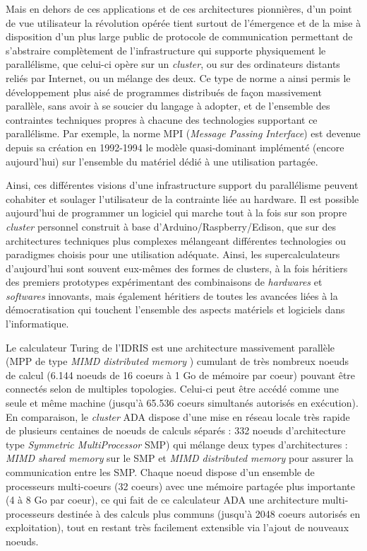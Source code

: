 Mais en dehors de ces applications et de ces architectures pionnières, d’un point de vue utilisateur la révolution opérée tient surtout de l’émergence et de la mise à disposition d’un plus large public de protocole de communication permettant de s’abstraire complètement de l’infrastructure qui supporte physiquement le parallélisme, que celui-ci opère sur un \textit{cluster}, ou sur des ordinateurs distants reliés par Internet, ou un mélange des deux. Ce type de norme a ainsi permis le développement plus aisé de programmes distribués de façon massivement parallèle, sans avoir à se soucier du langage à adopter, et de l’ensemble des contraintes techniques propres à chacune des technologies supportant ce parallélisme. Par exemple, la norme MPI (\textit{Message Passing Interface}) est devenue depuis sa création en 1992-1994 le modèle quasi-dominant implémenté (encore aujourd’hui) sur l’ensemble du matériel dédié à une utilisation partagée.

Ainsi, ces différentes visions d'une infrastructure support du parallélisme peuvent cohabiter et soulager l'utilisateur de la contrainte liée au hardware. Il est possible aujourd'hui de programmer un logiciel qui marche tout à la fois sur son propre \textit{cluster} personnel construit à base d'Arduino/Raspberry/Edison, que sur des architectures techniques plus complexes mélangeant différentes technologies ou paradigmes choisis pour une utilisation adéquate. Ainsi, les supercalculateurs d'aujourd'hui sont souvent eux-mêmes des formes de clusters, à la fois héritiers des premiers prototypes expérimentant des combinaisons de \textit{hardwares} et \textit{softwares} innovants, mais également héritiers de toutes les avancées liées à la démocratisation qui touchent l'ensemble des aspects matériels et logiciels dans l'informatique.

Le calculateur Turing de l'IDRIS  est une architecture massivement parallèle (MPP de type \textit{MIMD distributed memory} \autocite{Snir2011}) cumulant de très nombreux noeuds de calcul (6.144 noeuds de 16 coeurs à 1 Go de mémoire par coeur) pouvant être connectés selon de multiples topologies. Celui-ci peut être accédé comme une seule et même machine (jusqu'à 65.536 coeurs simultanés autorisés en exécution). En comparaison, le \textit{cluster} ADA dispose d'une mise en réseau locale très rapide de plusieurs centaines de noeuds de calculs séparés : 332 noeuds d'architecture type \textit{Symmetric MultiProcessor} SMP) qui mélange deux types d'architectures : \textit{MIMD shared memory} sur le SMP et \textit{MIMD distributed memory} pour assurer la communication entre les SMP. Chaque noeud dispose d'un ensemble de processeurs multi-coeurs (32 coeurs) avec une mémoire partagée plus importante (4 à 8 Go par coeur), ce qui fait de ce calculateur ADA une architecture multi-processeurs destinée à des calculs plus communs (jusqu'à 2048 coeurs autorisés en exploitation), tout en restant très facilement extensible via l'ajout de nouveaux noeuds.

